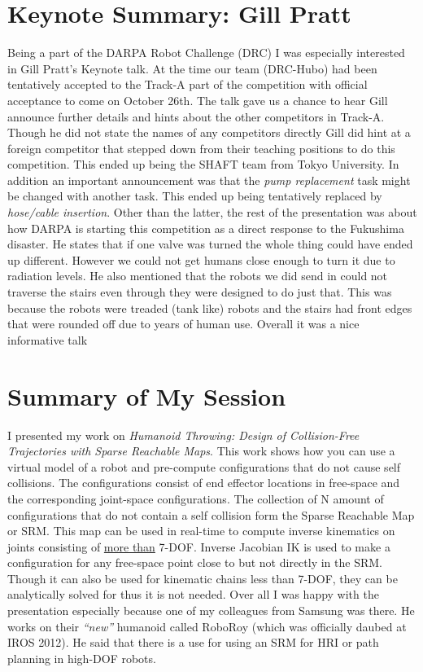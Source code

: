 \documentclass[11pt,a4paper,oneside]{report}
\begin{document}
\section*{Keynote Summary: Gill Pratt}
Being a part of the DARPA Robot Challenge (DRC) I was especially interested in Gill Pratt's Keynote talk.  
At the time our team (DRC-Hubo) had been tentatively accepted to the Track-A part of the competition with official acceptance to come on October 26th.  
The talk gave us a chance to hear Gill announce further details and hints about the other competitors in Track-A.  
Though he did not state the names of any competitors directly Gill did hint at a foreign competitor that stepped down from their teaching positions to do this competition.  
This ended up being the SHAFT team from Tokyo University.  
In addition an important announcement was that the \textit{pump replacement} task might be changed with another task.
This ended up being tentatively replaced by \textit{hose/cable insertion}.  
Other than the latter, the rest of the presentation was about how DARPA is starting this competition as a direct response to the Fukushima disaster. 
He states that if one valve was turned the whole thing could have ended up different.
However we could not get humans close enough to turn it due to radiation levels.
He also mentioned that the robots we did send in could not traverse the stairs even through they were designed to do just that. 
This was because the robots were treaded (tank like) robots and the stairs had front edges that were rounded off due to years of human use.
Overall it was a nice informative talk

\section*{Summary of My Session}
I presented my work on \textit{Humanoid Throwing: Design of Collision-Free Trajectories with Sparse Reachable Maps}.  
This work shows how you can use a virtual model of a robot and pre-compute configurations that do not cause self collisions.  
The configurations consist of end effector locations in free-space and the corresponding joint-space configurations.  
The collection of N amount of configurations that do not contain a self collision form the Sparse Reachable Map or SRM.  
This map can be used in real-time to compute inverse kinematics on joints consisting of \underline{more than} 7-DOF.  
Inverse Jacobian IK is used to make a configuration for any free-space point close to but not directly in the SRM.
Though it can also be used for kinematic chains less than 7-DOF, they can be analytically solved for thus it is not needed.
Over all I was happy with the presentation especially because one of my colleagues from Samsung was there.
He works on their \textit{``new''} humanoid called RoboRoy (which was officially daubed at IROS 2012).
He said that there is a use for using an SRM for HRI or path planning in high-DOF robots.
\end{document}

